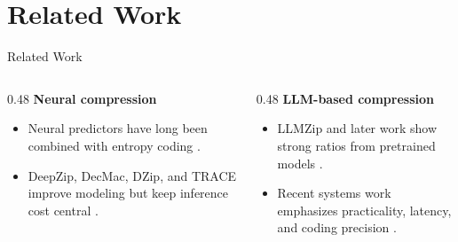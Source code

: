 
\section{Related Work}

\begin{frame}{Related Work}
  \begin{columns}[T, onlytextwidth]
    \begin{column}{0.48\textwidth}
      \textbf{Neural compression}
      \begin{itemize}
        \item Neural predictors have long been combined with entropy coding \parencite{schmidhuberSequentialNeuralText1996}.
        \item DeepZip, DecMac, DZip, and TRACE improve modeling but keep inference cost central \parencite{goyalDeepZipLosslessData2019,liuDecMacDeepContext2019,goyalDZipImprovedGeneralpurpose2021,maoTRACEFastTransformerbased2022}.
      \end{itemize}
    \end{column}
    \hfill
    \begin{column}{0.48\textwidth}
      \textbf{LLM-based compression}
      \begin{itemize}
        \item LLMZip and later work show strong ratios from pretrained models \parencite{llmzip,lossless_data_compression_llm}.
        \item Recent systems work emphasizes practicality, latency, and coding precision \parencite{finezip,tacconelliNacrithNeuralLossless2026,Kipf2026WaitingTD}.
      \end{itemize}
    \end{column}
  \end{columns}
\end{frame}

